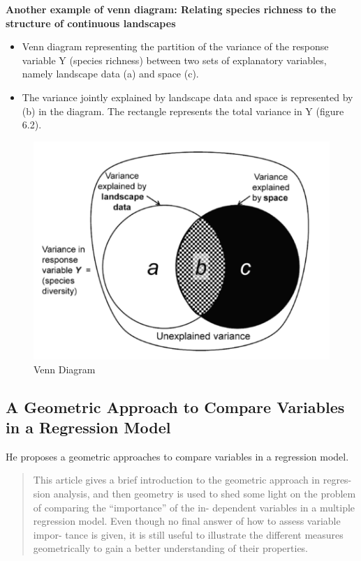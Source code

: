 \documentclass[
]{report}
\providecommand{\tightlist}{%
  \setlength{\itemsep}{0pt}\setlength{\parskip}{0pt}}
\begin{document}
\textbf{Another example of venn diagram: Relating species richness to the structure of continuous landscapes}

\begin{itemize}
\tightlist
\item
  Venn diagram representing the partition of the variance of the response variable Y (species richness) between two sets of explanatory variables, namely landscape data (a) and space (c).
\item
  The variance jointly explained by landscape data and space is represented by (b) in the diagram. The rectangle represents the total variance in Y (figure 6.2).
\end{itemize}

\begin{figure}
    \centering
    \includegraphics[width= 250 pt]{venn.PNG}
    \caption{Venn Diagram}
\end{figure}

\hypertarget{a-geometric-approach-to-compare-variables-in-a-regression-model}{%
\subsection{A Geometric Approach to Compare Variables in a Regression Model}\label{a-geometric-approach-to-compare-variables-in-a-regression-model}}

He proposes \citep{Bring} a geometric approaches to compare variables in a regression model.

\begin{quote}
This article gives a brief introduction to the geometric approach in regres- sion analysis, and then geometry is used to shed some light on the problem of comparing the ``importance'' of the in- dependent variables in a multiple regression model. Even though no final answer of how to assess variable impor- tance is given, it is still useful to illustrate the different measures geometrically to gain a better understanding of their properties.
\end{quote}
\end{document}
